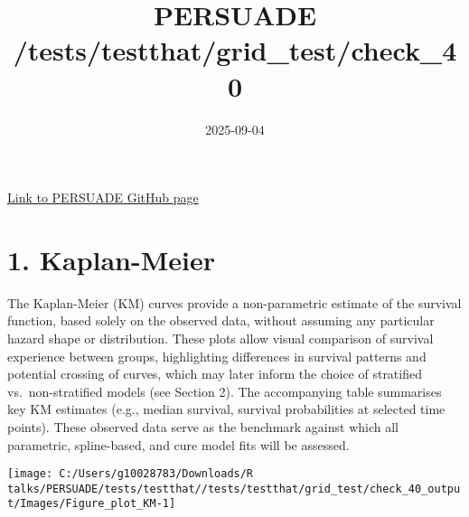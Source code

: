 \documentclass[
]{article}
\title{PERSUADE /tests/testthat/grid\_test/check\_40}
\author{}
\date{\vspace{-2.5em}2025-09-04}
\begin{document}
\maketitle

{
\hypersetup{linkcolor=}
\setcounter{tocdepth}{2}
\tableofcontents
}
\hfill\break

\href{https://github.com/Bram-R/PERSUADE}{Link to PERSUADE GitHub page}

\clearpage

\section{1. Kaplan-Meier}\label{kaplan-meier}

The Kaplan-Meier (KM) curves provide a non-parametric estimate of the
survival function, based solely on the observed data, without assuming
any particular hazard shape or distribution. These plots allow visual
comparison of survival experience between groups, highlighting
differences in survival patterns and potential crossing of curves, which
may later inform the choice of stratified vs.~non-stratified models (see
Section 2). The accompanying table summarises key KM estimates (e.g.,
median survival, survival probabilities at selected time points). These
observed data serve as the benchmark against which all parametric,
spline-based, and cure model fits will be assessed.

\clearpage

\begin{flushleft}\texttt{[image: C:/Users/g10028783/Downloads/R talks/PERSUADE/tests/testthat//tests/testthat/grid\_test/check\_40\_output/Images/Figure\_plot\_KM-1]} \end{flushleft}

\begin{table}[H]
\centering
\caption{\label{tab:Table_1}Observed survival data}
\centering
{}
\end{table}
\end{document}
